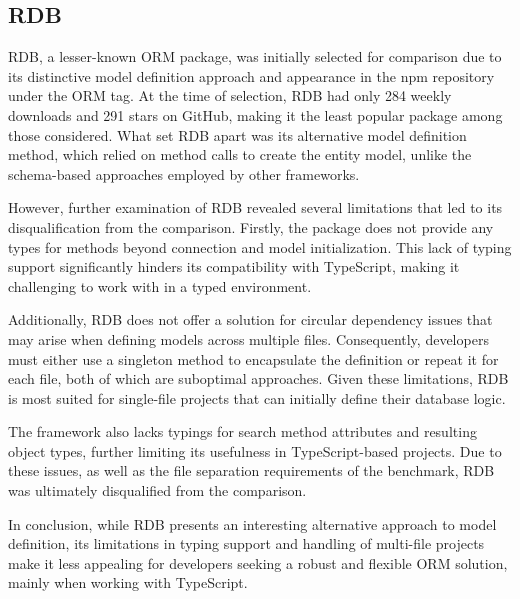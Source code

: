 \subsection{RDB}

RDB, a lesser-known ORM package, was initially selected for comparison due to
its distinctive model definition approach and appearance in the npm repository
under the ORM tag. At the time of selection, RDB had only 284 weekly downloads
and 291 stars on GitHub, making it the least popular package among those
considered. What set RDB apart was its alternative model definition method,
which relied on method calls to create the entity model, unlike the schema-based
approaches employed by other frameworks.

However, further examination of RDB revealed several limitations that led to its
disqualification from the comparison. Firstly, the package does not provide any
types for methods beyond connection and model initialization. This lack of
typing support significantly hinders its compatibility with TypeScript, making
it challenging to work with in a typed environment.

Additionally, RDB does not offer a solution for circular dependency issues that
may arise when defining models across multiple files. Consequently, developers
must either use a singleton method to encapsulate the definition or repeat it
for each file, both of which are suboptimal approaches. Given these limitations,
RDB is most suited for single-file projects that can initially define their
database logic.

The framework also lacks typings for search method attributes and resulting
object types, further limiting its usefulness in TypeScript-based projects. Due
to these issues, as well as the file separation requirements of the benchmark,
RDB was ultimately disqualified from the comparison.

In conclusion, while RDB presents an interesting alternative approach to model
definition, its limitations in typing support and handling of multi-file
projects make it less appealing for developers seeking a robust and flexible ORM
solution, mainly when working with TypeScript.
